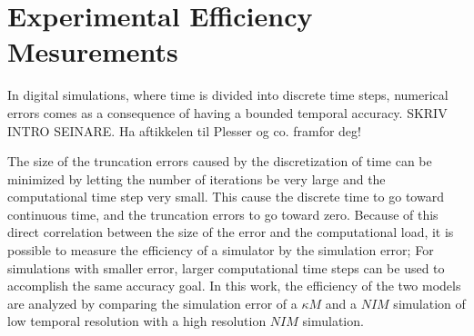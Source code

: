 \documentclass[b5paper,12 pt]{report}
\begin{document}

		
		
		



	
	\chapter{Experimental Efficiency Mesurements}
	\label{chExperimentalEfficiencyMeasurement}
		In digital simulations, where time is divided into discrete time steps, numerical errors comes as a consequence of having a bounded temporal accuracy. %
		SKRIV INTRO SEINARE. Ha aftikkelen til Plesser og co. framfor deg! %




The size of the truncation errors caused by the discretization of time can be minimized by letting the number of iterations be very large and the computational time step very small.
This cause the discrete time to go toward continuous time, and the truncation errors to go toward zero. %
Because of this direct correlation between the size of the error and the computational load, it is possible to measure the efficiency of a simulator by the simulation error;
	For simulations with smaller error, larger computational time steps can be used to accomplish the same accuracy goal.
In this work, the efficiency of the two models are analyzed by comparing the simulation error of a $\kappa M$ and a $NIM$ simulation of low temporal resolution with a high resolution $NIM$ simulation. %
\end{document}
